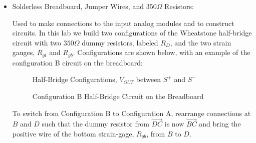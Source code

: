 \documentclass{article}
\begin{document}
\begin{itemize}
\item Solderless Breadboard, Jumper Wires, and $350\Omega$ Resistors: 
\vspace{1mm}

Used to make connections to the input analog modules and to construct circuits. In this lab we build two configurations of the Wheatstone half-bridge circuit with two $350\Omega$ dummy resistors, labeled $R_{D}$, and the two strain gauges, $R_{gt}$ and $R_{gb}$. Configurations are shown below, with an example of the configuration B circuit on the breadboard:

\hypertarget{fig1}{}
\begin{figure}[H]
    \centering
    \caption{Half-Bridge Configurations, $V_{OUT}$ between $S^{+}$ and $S^{-}$}
\end{figure}
\begin{figure}[H]
    \centering
    \caption{Configuration B Half-Bridge Circuit on the Breadboard}
\end{figure}

To switch from Configuration B to Configuration A, rearrange connections at $B$ and $D$ such that the dummy resistor from $\overrightarrow{DC}$ is now $\overrightarrow{BC}$ and bring the positive wire of the bottom strain-gage, $R_{gb}$, from $B$ to $D$.


\end{itemize}
\end{document}
